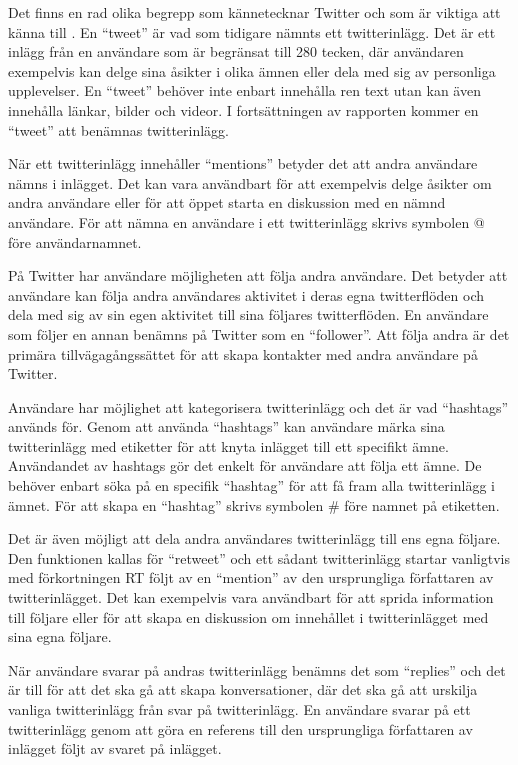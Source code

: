 \documentclass{kaumasters} %
\begin{document}
Det finns en rad olika begrepp som kännetecknar Twitter och som är viktiga att känna till \cite{TSAsurvey}. En “tweet” är vad som tidigare nämnts ett twitterinlägg. Det är ett inlägg från en användare som är begränsat till 280 tecken, där användaren exempelvis kan delge sina åsikter i olika ämnen eller dela med sig av personliga upplevelser. En “tweet” behöver inte enbart innehålla ren text utan kan även innehålla länkar, bilder och videor. I fortsättningen av rapporten kommer en “tweet” att benämnas twitterinlägg.

När ett twitterinlägg innehåller “mentions” betyder det att andra användare nämns i inlägget. Det kan vara användbart för att exempelvis delge åsikter om andra användare eller för att öppet starta en diskussion med en nämnd användare. För att nämna en användare i ett twitterinlägg skrivs symbolen @ före användarnamnet. 

På Twitter har användare möjligheten att följa andra användare. Det betyder att användare kan följa andra användares aktivitet i deras egna twitterflöden och dela med sig av sin egen aktivitet till sina följares twitterflöden. En användare som följer en annan benämns på Twitter som en “follower”. Att följa andra är det primära tillvägagångssättet för att skapa kontakter med andra användare på Twitter. 

Användare har möjlighet att kategorisera twitterinlägg och det är vad “hashtags” används för. Genom att använda “hashtags” kan användare märka sina twitterinlägg med etiketter för att knyta inlägget till ett specifikt ämne. Användandet av hashtags gör det enkelt för användare att följa ett ämne. De behöver enbart söka på en specifik “hashtag” för att få fram alla twitterinlägg i ämnet. För att skapa en “hashtag” skrivs symbolen \# före namnet på etiketten.

Det är även möjligt att dela andra användares twitterinlägg till ens egna följare. Den funktionen kallas för “retweet” och ett sådant twitterinlägg startar vanligtvis med förkortningen RT följt av en “mention” av den ursprungliga författaren av twitterinlägget. Det kan exempelvis vara användbart för att sprida information till följare eller för att skapa en diskussion om innehållet i twitterinlägget med sina egna följare. 

När användare svarar på andras twitterinlägg benämns det som “replies” och det är till för att det ska gå att skapa konversationer, där det ska gå att urskilja vanliga twitterinlägg från svar på twitterinlägg. En användare svarar på ett twitterinlägg genom att göra en referens till den ursprungliga författaren av inlägget följt av svaret på inlägget.
\end{document}
